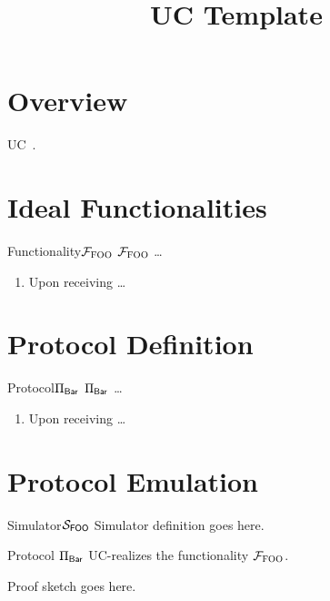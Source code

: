 \documentclass{llncs}
\title{UC Template}
\author{}
\institute{}
\begin{document}
\maketitle

\section{Overview}

UC~\cite{canetti2001universally}.

\section{Ideal Functionalities}

\begin{boxdef}{Functionality}{$\mathcal{{F}}_{\textsc{FOO}}$}
  $\mathcal{{F}}_{\textsc{FOO}}$ \ldots
  \begin{enumerate}
    \item Upon receiving \ldots
  \end{enumerate}
\end{boxdef}

\section{Protocol Definition}

\begin{boxdef}{Protocol}{$\Pi_{\sf Bar}$}
  $\Pi_{\sf Bar}$ \ldots
  \begin{enumerate}
    \item Upon receiving \ldots
   \end{enumerate}
\end{boxdef}

\section{Protocol Emulation}

\begin{boxdef}{Simulator}{$\mathcal{{S}}_{\sf FOO}$}
Simulator definition goes here.
\end{boxdef}

\begin{theorem}
Protocol $\Pi_{\sf Bar}$ UC-realizes the functionality $\mathcal{{F}}_{\textsc{FOO}}$.
\end{theorem}

\begin{proof-sketch}
Proof sketch goes here.

\end{proof-sketch}
    


\end{document}
